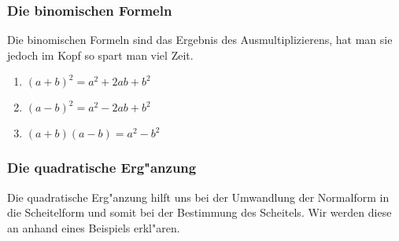 \subsubsection{Die binomischen Formeln}
Die binomischen Formeln sind das Ergebnis des Ausmultiplizierens, hat man sie jedoch im Kopf so spart man viel Zeit.
\begin{enumerate}
\item $(a+b)^2=a^2+2ab+b^2$
\item $(a-b)^2=a^2-2ab+b^2$
\item $(a+b)(a-b)=a^2-b^2$
\end{enumerate}

\subsubsection{Die quadratische Erg"anzung}
Die quadratische Erg"anzung hilft uns bei der Umwandlung der Normalform in die Scheitelform und somit bei der Bestimmung des Scheitels. Wir werden diese an anhand eines Beispiels erkl"aren.


